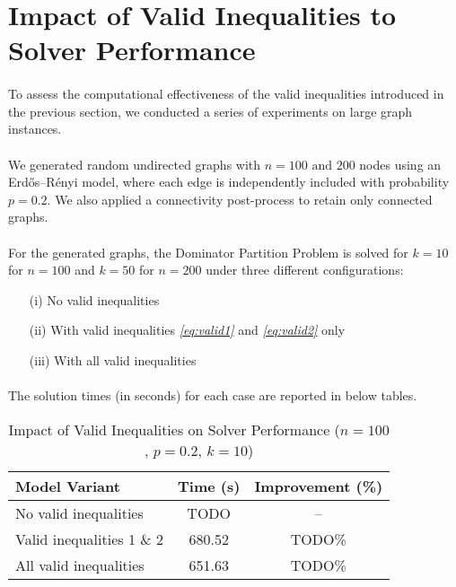 \section{Impact of Valid Inequalities to Solver Performance}
\label{sec:impact_of_valid_inequalities}


\paragraph{} To assess the computational effectiveness of the valid inequalities introduced in the previous section, we conducted a series of experiments on large graph instances.

\paragraph{} We generated random undirected graphs with $n = 100 \text{ and } 200$ nodes using an Erdős–Rényi model, where each edge is independently included with probability $p = 0.2$. We also applied a connectivity post-process to retain only connected graphs.

\paragraph{} For the generated graphs, the Dominator Partition Problem is solved for $k = 10$ for $n=100$ and $k = 50$ for $n=200$ under three different configurations:
\begin{itemize}
    \item[(i)] No valid inequalities
    \item[(ii)] With valid inequalities \textsl{\eqref{eq:valid1}} and \textsl{\eqref{eq:valid2}} only
    \item[(iii)] With all valid inequalities
\end{itemize}

\paragraph{} The solution times (in seconds) for each case are reported in below tables.
\begin{table}[H]
\centering
\caption{Impact of Valid Inequalities on Solver Performance ($n=100$, $p=0.2$, $k=10$)}
\label{tab:performance1}
\begin{tabular}{l|c|c}
\textbf{Model Variant} & \textbf{Time (s)} & \textbf{Improvement (\%)} \\
\hline
No valid inequalities        & TODO & -- \\
Valid inequalities 1 \& 2    & 680.52 & TODO\% \\
All valid inequalities       & 651.63 & TODO\% \\
\end{tabular}
\end{table}

